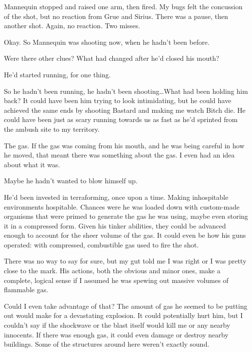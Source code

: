 Mannequin stopped and raised one arm, then fired.  My bugs felt the concussion of the shot, but no reaction from Grue and Sirius.  There was a pause, then another shot.  Again, no reaction.  Two misses.



Okay.  So Mannequin was shooting now, when he hadn't been before.



Were there other clues?  What had changed after he'd closed his mouth?



He'd started running, for one thing.



So he hadn't been running, he hadn't been shooting\ldots  What had been holding him back?  It could have been him trying to look intimidating, but he could have achieved the same ends by shooting Bastard and making me watch Bitch die.  He could have been just as scary running towards us as fast as he'd sprinted from the ambush site to my territory.



The gas.  If the gas was coming from his mouth, and he was being careful in how he moved, that meant there was something about the gas.  I even had an idea about what it was.



Maybe he hadn't wanted to blow himself up.



He'd been invested in terraforming, once upon a time.  Making inhospitable environments hospitable.  Chances were he was loaded down with custom-made organisms that were primed to generate the gas he was using, maybe even storing it in a compressed form.  Given his tinker abilities, they could be advanced enough to account for the sheer volume of the gas.  It could even be how his guns operated: with compressed, combustible gas used to fire the shot.



There was no way to say for sure, but my gut told me I was right or I was pretty close to the mark.  His actions, both the obvious and minor ones, make a complete, logical sense if I assumed he was spewing out massive volumes of flammable gas.



Could I even take advantage of that?  The amount of gas he seemed to be putting out would make for a devastating explosion.  It could potentially hurt him, but I couldn't say if the shockwave or the blast itself would kill me or any nearby innocents.  If there was enough gas, it could even damage or destroy nearby buildings.  Some of the structures around here weren't exactly sound.



